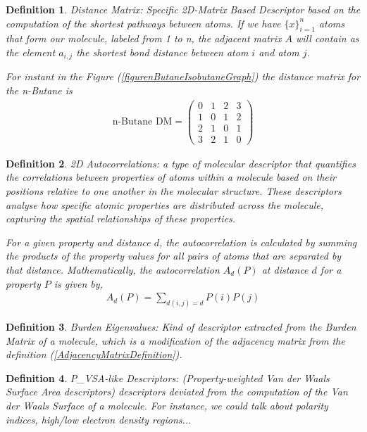 \documentclass[12pt,letterpaper]{article}
\newtheorem{definition}{Definition}
\begin{document}
\begin{multicols}{2}
\begin{definition}
Distance Matrix: Specific 2D-Matrix Based Descriptor based on the computation of the shortest pathways between atoms. If we have $\{x\}_{i=1}^n$ atoms that form our molecule, labeled from 1 to n, the adjacent matrix $A$ will contain as the element $a_{i,j}$ the shortest bond distance between atom $i$ and atom $j$.\par
For instant in the Figure (\ref{figurenButaneIsobutaneGraph}) the distance matrix for the n-Butane is
\begin{align}
\text{n-Butane DM}=\begin{pmatrix}
0 & 1 & 2 & 3 \\
1 & 0 & 1 & 2 \\
2 & 1 & 0 & 1 \\
3 & 2 & 1 & 0 
\end{pmatrix}
\end{align}
\end{definition}

\begin{definition}
2D Autocorrelations: a type of molecular descriptor that quantifies the correlations between properties of atoms within a molecule based on their positions relative to one another in the molecular structure. These descriptors analyse how specific atomic properties are distributed across the molecule, capturing the spatial relationships of these properties. \par
For a given property and distance $d$, the autocorrelation is calculated by summing the products of the property values for all pairs of atoms that are separated by that distance. Mathematically, the autocorrelation  $A_d(P)$  at distance  $d$  for a property $P$  is given by,
\begin{align}
A_d(P)=\sum_{d(i,j)=d}P(i)P(j)
\end{align}
\end{definition}
\begin{definition}
Burden Eigenvalues: Kind of descriptor extracted from the Burden Matrix of a molecule\cite{BurdenIndicesArticle}, which is a modification of the adjacency matrix from the definition (\ref{AdjacencyMatrixDefinition}). 
\end{definition}

\begin{definition}
P\_VSA-like Descriptors: (Property-weighted Van der Waals Surface Area descriptors) descriptors deviated from the computation of the Van der Waals Surface of a molecule. For instance, we could talk about polarity indices, high/low electron density regions...
\end{definition}


\end{multicols}
\end{document}
